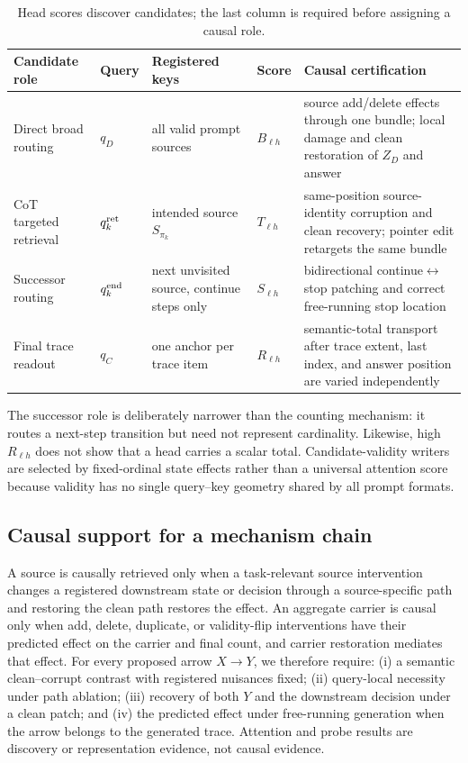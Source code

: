 \documentclass[11pt]{article}
\begin{document}
\begin{table}[H]
\centering
\small
\caption{Head scores discover candidates; the last column is required before assigning a causal role.}
\label{tab:head-scores}
\begin{tabularx}{\textwidth}{@{}P{.14\textwidth}P{.16\textwidth}P{.20\textwidth}P{.13\textwidth}Y@{}}
\toprule
Candidate role & Query & Registered keys & Score & Causal certification \\
\midrule
Direct broad routing & $q_D$ & all valid prompt sources & $B_{\ell h}$ & source add/delete effects through one bundle; local damage and clean restoration of $Z_D$ and answer \\
CoT targeted retrieval & $q_k^{\rm ret}$ & intended source $S_{\pi_k}$ & $T_{\ell h}$ & same-position source-identity corruption and clean recovery; pointer edit retargets the same bundle \\
Successor routing & $q_k^{\rm end}$ & next unvisited source, continue steps only & $S_{\ell h}$ & bidirectional continue$\leftrightarrow$stop patching and correct free-running stop location \\
Final trace readout & $q_C$ & one anchor per trace item & $R_{\ell h}$ & semantic-total transport after trace extent, last index, and answer position are varied independently \\
\bottomrule
\end{tabularx}
\end{table}

The successor role is deliberately narrower than the counting mechanism: it routes a next-step transition but need not represent cardinality. Likewise, high $R_{\ell h}$ does not show that a head carries a scalar total. Candidate-validity writers are selected by fixed-ordinal state effects rather than a universal attention score because validity has no single query--key geometry shared by all prompt formats.

\subsection{Causal support for a mechanism chain}

A source is causally retrieved only when a task-relevant source intervention changes a registered downstream state or decision through a source-specific path and restoring the clean path restores the effect. An aggregate carrier is causal only when add, delete, duplicate, or validity-flip interventions have their predicted effect on the carrier and final count, and carrier restoration mediates that effect. For every proposed arrow $X\rightarrow Y$, we therefore require: (i) a semantic clean--corrupt contrast with registered nuisances fixed; (ii) query-local necessity under path ablation; (iii) recovery of both $Y$ and the downstream decision under a clean patch; and (iv) the predicted effect under free-running generation when the arrow belongs to the generated trace. Attention and probe results are discovery or representation evidence, not causal evidence.
\end{document}

